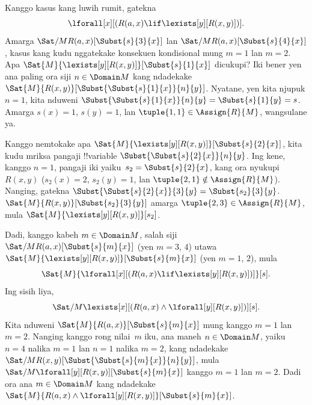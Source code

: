 \documentclass[../../../include/open-logic-section]{subfiles}
\begin{document}
\begin{ex}

Kanggo kasus kang luwih rumit, gatekna
\[
\lforall[x][(R(a,x) \lif \lexists[y][R(x,y)])].
\]
Amarga $\Sat/{M}{R(a,x)}[\Subst{s}{3}{x}]$ lan
$\Sat/{M}{R(a,x)}[\Subst{s}{4}{x}]$, kasus kang kudu
nggatekake konsekuen kondisional mung $m = 1$
lan $m = 2$. Apa
$\Sat{M}{\lexists[y][R(x,y)]}[\Subst{s}{1}{x}]$
dicukupi? Iki bener yen ana paling ora siji $n \in \Domain M$
kang ndadekake $\Sat{M}{R(x,y)}[\Subst{\Subst{s}{1}{x}}{n}{y}]$.
Nyatane, yen kita njupuk $n = 1$, kita nduweni
$\Subst{\Subst{s}{1}{x}}{n}{y} = \Subst{s}{1}{y} =
s$. Amarga $s(x) = 1$, $s(y) = 1$, lan
$\tuple{1,1} \in \Assign{R}{M}$, wangsulane ya.

Kanggo nemtokake apa
$\Sat{M}{\lexists[y][R(x,y)]}[\Subst{s}{2}{x}]$,
kita kudu mriksa pangaji !!{variable}
$\Subst{\Subst{s}{2}{x}}{n}{y}$. Ing kene, kanggo $n = 1$,
pangaji iki yaiku~$s_2 = \Subst{s}{2}{x}$,
kang ora nyukupi $R(x,y)$ ($s_2(x) = 2$, $s_2(y) = 1$,
lan $\tuple{2,1}\notin \Assign{R}{M}$).
Nanging, gatekna $\Subst{\Subst{s}{2}{x}}{3}{y} =
\Subst{s_2}{3}{y}$.
$\Sat{M}{R(x,y)}[\Subst{s_2}{3}{y}]$ amarga
$\tuple{2,3} \in \Assign{R}{M}$, mula
$\Sat{M}{\lexists[y][R(x,y)]}[s_2]$.

Dadi, kanggo kabeh $m \in \Domain M$, salah siji
$\Sat/{M}{R(a,x)}[\Subst{s}{m}{x}]$ (yen $m = 3$, $4$)
utawa $\Sat{M}{\lexists[y][R(x,y)]}[\Subst{s}{m}{x}]$
(yen $m = 1$, $2$), mula
\[
\Sat{M}{\lforall[x][(R(a,x) \lif \lexists[y][R(x,y)])]}[s].
\]
 Ing sisih liya,
\[
\Sat/{M}{\lexists[x][(R(a,x) \land \lforall[y][R(x,y)])]}[s].
\]
Kita nduweni $\Sat{M}{R(a,x)}[\Subst{s}{m}{x}]$
mung kanggo $m = 1$ lan $m = 2$. Nanging kanggo
rong nilai~$m$ iku, ana maneh $n \in \Domain M$,
yaiku $n = 4$ nalika $m = 1$ lan $n = 1$ nalika $m = 2$, kang ndadekake
$\Sat/{M}{R(x,y)}[\Subst{\Subst{s}{m}{x}}{n}{y}]$,
mula $\Sat/{M}{\lforall[y][R(x,y)]}[\Subst{s}{m}{x}]$
kanggo $m = 1$ lan $m = 2$. Dadi ora ana
$m \in \Domain M$ kang ndadekake
$\Sat{M}{R(a,x) \land \lforall[y][R(x,y)]}[\Subst{s}{m}{x}]$.
\end{ex}
\end{document}
